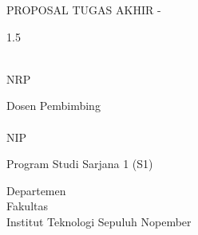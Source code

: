 \begin{large}
  PROPOSAL TUGAS AKHIR - \coursecode{}
\end{large}

\vspace{\fill}

\begin{spacing}{1.5}
  \begin{Large}
    \tatitle{}
  \end{Large}
\end{spacing}

\vspace{\fill}

\begin{large}
  \name{} \\
  \textmd{NRP \nrp{}}
\end{large}

\vspace{\fill}

\begin{large}
  \textmd{Dosen Pembimbing} \\
  \advisor{} \\
  \textmd{NIP \advisornip{}} \\
\end{large}

\vspace{\fill}

Program Studi Sarjana 1 (S1) \studyprogram{} \\

\mdseries

Departemen \department{} \\
Fakultas \faculty{} \\
Institut Teknologi Sepuluh Nopember

\place{} \\ \the\year{}
